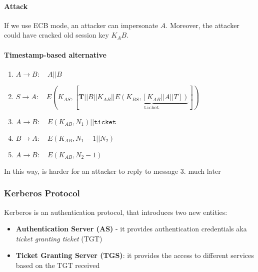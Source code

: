 \paragraph{Attack} If we use ECB mode, an attacker can impersonate $A$. Moreover, the attacker could have cracked old session key $K_AB$.

\paragraph{Timestamp-based alternative}
\begin{enumerate}
    \item $A\rightarrow B:\hspace{1em} A||B$
    \item $S\rightarrow A:\hspace{1em} E(K_{AS},[\textbf{T}||B||K_{AB}||\underbrace{E(K_{BS},[K_{AB}||A||T])}_{\texttt{ticket}}])$
    \item $A\rightarrow B:\hspace{1em} E(K_{AB},N_1)||\texttt{ticket}$
    \item $B\rightarrow A:\hspace{1em} E(K_{AB},N_1-1||N_2)$
    \item $A\rightarrow B:\hspace{1em} E(K_{AB},N_2-1)$
\end{enumerate}
In this way, is harder for an attacker to reply to message $3.$ much later

\subsubsection{Kerberos Protocol}
Kerberos is an authentication protocol, that introduces two new entities:
\begin{itemize}
    \item \textbf{Authentication Server (AS)} - it provides authentication credentials aka \textit{ticket granting ticket} (TGT)
    \item \textbf{Ticket Granting Server (TGS)}: it provides the access to different services based on the TGT received
\end{itemize}
